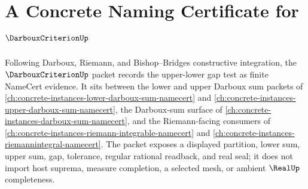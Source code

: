 \chapter{A Concrete Naming Certificate for $\DarbouxCriterionUp$}
\label{ch:concrete-instances-darboux-criterion-namecert}

Following Darboux, Riemann, and Bishop--Bridges constructive integration, the $\DarbouxCriterionUp$ packet records the upper-lower gap test as finite NameCert evidence. It sits between the lower and upper Darboux sum packets of \autoref{ch:concrete-instances-lower-darboux-sum-namecert} and \autoref{ch:concrete-instances-upper-darboux-sum-namecert}, the Darboux-sum surface of \autoref{ch:concrete-instances-darboux-sum-namecert}, and the Riemann-facing consumers of \autoref{ch:concrete-instances-riemann-integrable-namecert} and \autoref{ch:concrete-instances-riemannintegral-namecert}. The packet exposes a displayed partition, lower sum, upper sum, gap, tolerance, regular rational readback, and real seal; it does not import host suprema, measure completion, a selected mesh, or ambient $\RealUp$ completeness.

